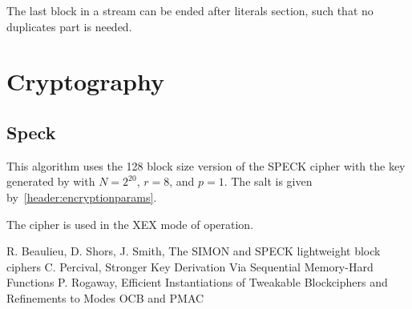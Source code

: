 \documentclass[11pt,a4paper]{report}
\begin{document}
        The last block in a stream can be ended after literals section, such
        that no duplicates part is needed.

    \section{Cryptography}
        \subsection{Speck}
        \label{crypto:speck}
        This algorithm uses the 128 block size version of the SPECK
        cipher\cite{speck} with the key generated by \cite{scrypt} with $N =
        2^{20}$, $r = 8$, and $p = 1$. The salt is given
        by~\ref{header:encryptionparams}.

        The cipher is used in the XEX mode of operation\cite{xex}.

    \begin{thebibliography}{9}
        R. Beaulieu, D. Shors, J. Smith, The SIMON and SPECK lightweight block ciphers
        C. Percival, Stronger Key Derivation Via Sequential Memory-Hard Functions
        P. Rogaway, Efficient Instantiations of Tweakable Blockciphers and Refinements to Modes OCB and PMAC
    \end{thebibliography}
\end{document}
